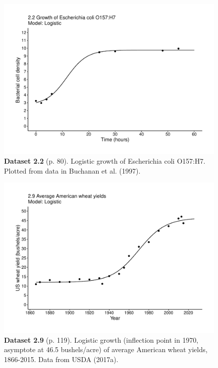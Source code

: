 \documentclass[aps,rmp,preprint,superscriptaddress,10pt,onecolumn]{article}
\begin{document}
\clearpage
\begin{figure}[h]
\includegraphics[width=\textwidth]{output/figs-ggplot/2.2.pdf}
\caption*{\textbf{Dataset 2.2} (p. 80). Logistic growth of Escherichia coli O157:H7. Plotted from data in Buchanan et al. (1997).}
\end{figure}
	
\clearpage
\begin{figure}[h]
\includegraphics[width=\textwidth]{output/figs-ggplot/2.9.pdf}
\caption*{\textbf{Dataset 2.9} (p. 119). Logistic growth (inflection point in 1970, asymptote at 46.5 bushels/acre) of average American wheat yields, 1866-2015. Data from USDA (2017a).}
\end{figure}
	
\end{document}
